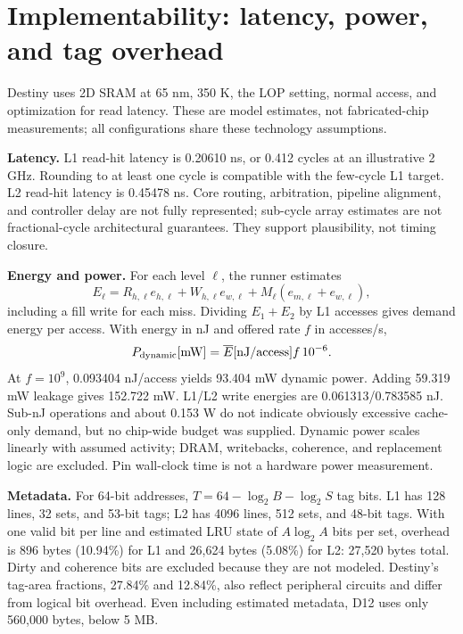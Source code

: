 \documentclass[10pt,letterpaper]{article}
\begin{document}
\section{Implementability: latency, power, and tag overhead}
Destiny uses 2D SRAM at 65 nm, 350 K, the LOP setting, normal access, and
optimization for read latency. These are model estimates, not fabricated-chip
measurements; all configurations share these technology assumptions.
\begin{table}[H]\centering
\caption{Destiny metrics for D12: 8 KiB/64 B/4-way L1; 512 KiB/128 B/8-way L2.}

\end{table}
\textbf{Latency.} L1 read-hit latency is 0.20610 ns, or 0.412 cycles at an
illustrative 2 GHz. Rounding to at least one cycle is compatible with the
few-cycle L1 target. L2 read-hit latency is 0.45478 ns. Core routing, arbitration,
pipeline alignment, and controller delay are not fully represented; sub-cycle
array estimates are not fractional-cycle architectural guarantees. They support
plausibility, not timing closure.

\textbf{Energy and power.} For each level $\ell$, the runner estimates
\begin{equation}
E_\ell=R_{h,\ell}e_{h,\ell}+W_{h,\ell}e_{w,\ell}
       +M_\ell(e_{m,\ell}+e_{w,\ell}),
\end{equation}
including a fill write for each miss. Dividing $E_1+E_2$ by L1 accesses gives
demand energy per access. With energy in nJ and offered rate $f$ in accesses/s,
\begin{equation}
P_{\rm dynamic}[\mathrm{mW}]=\overline E[\mathrm{nJ/access}]f\,10^{-6}.
\end{equation}
At $f=10^9$, 0.093404 nJ/access yields 93.404 mW dynamic power. Adding
59.319 mW leakage gives 152.722 mW. L1/L2 write energies are 0.061313/0.783585
nJ. Sub-nJ operations and about 0.153 W do not indicate obviously excessive
cache-only demand, but no chip-wide budget was supplied. Dynamic power scales
linearly with assumed activity; DRAM, writebacks, coherence, and replacement
logic are excluded. Pin wall-clock time is not a hardware power measurement.

\textbf{Metadata.} For 64-bit addresses, $T=64-\log_2 B-\log_2 S$ tag bits.
L1 has 128 lines, 32 sets, and 53-bit tags; L2 has 4096 lines, 512 sets, and
48-bit tags. With one valid bit per line and estimated LRU state of
$A\log_2A$ bits per set, overhead is 896 bytes (10.94\%) for L1 and 26,624
bytes (5.08\%) for L2: 27,520 bytes total. Dirty and coherence bits are excluded
because they are not modeled. Destiny's tag-area fractions, 27.84\% and 12.84\%,
also reflect peripheral circuits and differ from logical bit overhead. Even
including estimated metadata, D12 uses only 560,000 bytes, below 5 MB.
\end{document}
